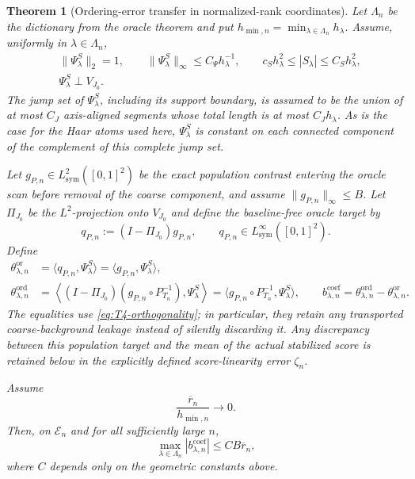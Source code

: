 \documentclass[11pt]{article}
\newtheorem{theorem}{Theorem}[section]
\theoremstyle{definition}
\newcommand{\1}{\mathbf 1}\newcommand{\op}{\operatorname}
\begin{document}
\begin{theorem}[Ordering-error transfer in normalized-rank coordinates]
Let $\Lambda_n$ be the dictionary from the oracle theorem and put
$h_{\min,n}=\min_{\lambda\in\Lambda_n}h_\lambda$.
Assume, uniformly in $\lambda\in\Lambda_n$,
\begin{align}
 &\|\Psi_\lambda^S\|_2=1,
 \qquad
 \|\Psi_\lambda^S\|_\infty\le C_\Psi h_\lambda^{-1},
 \qquad
 c_Sh_\lambda^2\le |S_\lambda|\le C_Sh_\lambda^2,
 \label{eq:T4-Haar-geometry}\\
 &\Psi_\lambda^S\perp V_{J_0}.
 \label{eq:T4-orthogonality}
\end{align}
The jump set of $\Psi_\lambda^S$, including its support boundary,
is assumed to be the union of at most $C_J$ axis-aligned segments
whose total length is at most $C_Jh_\lambda$.  As is the case for the
Haar atoms used here, $\Psi_\lambda^S$ is constant on each connected
component of the complement of this complete jump set.

Let $g_{P,n}\in L^2_{\mathrm{sym}}([0,1]^2)$ be the exact population
contrast entering the oracle scan before removal of the coarse
component, and assume $\|g_{P,n}\|_\infty\le B$.  Let
$\Pi_{J_0}$ be the $L^2$-projection onto $V_{J_0}$ and define the
baseline-free oracle target by
\begin{equation}
 q_{P,n}:=(I-\Pi_{J_0})g_{P,n},\qquad
 q_{P,n}\in L^\infty_{\mathrm{sym}}([0,1]^2).
 \label{eq:T4-exact-contrast}
\end{equation}
Define
\begin{align}
 \theta_{\lambda,n}^{\mathrm{or}}
 &=\langle q_{P,n},\Psi_\lambda^S\rangle
 =\langle g_{P,n},\Psi_\lambda^S\rangle,
 \nonumber\\
 \theta_{\lambda,n}^{\mathrm{ord}}
 &=\left\langle
 (I-\Pi_{J_0})(g_{P,n}\circ P_{T_n}^{-1}),
 \Psi_\lambda^S\right\rangle
 =\langle g_{P,n}\circ P_{T_n}^{-1},\Psi_\lambda^S\rangle,
 \qquad
 b_{\lambda,n}^{\mathrm{coef}}
 =\theta_{\lambda,n}^{\mathrm{ord}}
  -\theta_{\lambda,n}^{\mathrm{or}}.
 \label{eq:T4-coefficients}
\end{align}
The equalities use \eqref{eq:T4-orthogonality}; in particular, they
retain any transported coarse-background leakage instead of silently
discarding it.  Any discrepancy between this population
target and the mean of the actual stabilized score is retained below
in the explicitly defined score-linearity error $\zeta_n$.

Assume
\begin{equation}
 \frac{\overline r_n}{h_{\min,n}}\to0.
 \label{eq:T4-small-radius}
\end{equation}
Then, on $\mathcal E_n$ and for all sufficiently large $n$,
\begin{equation}
 \max_{\lambda\in\Lambda_n}
 |b_{\lambda,n}^{\mathrm{coef}}|
 \le C B\overline r_n,
 \label{eq:T4-coefficient-bound}
\end{equation}
where $C$ depends only on the geometric constants above.


\end{theorem}
\end{document}
